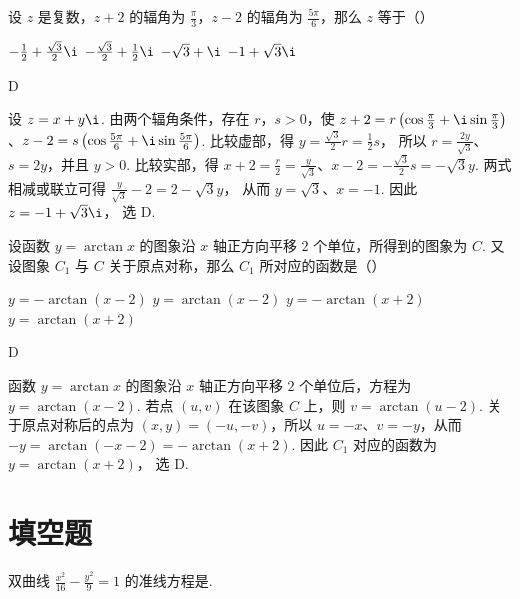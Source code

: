 \documentclass[UTF8,a4paper,oneside,11pt]{ctexbook}
\begin{document}
\begin{problem}
设 \(z\) 是复数，\(z + 2\) 的辐角为 \(\frac{\pi}{3}\)，\(z - 2\) 的辐角为 \(\frac{5\pi}{6}\)，那么 \(z\) 等于（\quad）

\choices
    {\(-\frac{1}{2}+\frac{\sqrt{3}}{2}\i\)}
    {\(-\frac{\sqrt{3}}{2}+\frac{1}{2}\i\)}
    {\(-\sqrt{3}+\i\)}
    {\(-1+\sqrt{3}\i\)}
\end{problem}

\begin{answer}
D
\end{answer}

\begin{solution}
	设 \(z=x+y\i\). 由两个辐角条件，存在 \(r\)，\(s>0\)，使
\(z+2=r\left(\cos\frac{\pi}{3}+\i\sin\frac{\pi}{3}\right)\)、\(z-2=s\left(\cos\frac{5\pi}{6}+\i\sin\frac{5\pi}{6}\right)\).
比较虚部，得
\(y=\frac{\sqrt{3}}{2}r=\frac12s\)，
所以 \(r=\frac{2y}{\sqrt{3}}\)、\(s=2y\)，并且 \(y>0\). 比较实部，得
\(x+2=\frac r2=\frac{y}{\sqrt{3}}\)、\(x-2=-\frac{\sqrt{3}}2s=-\sqrt{3}y\).
两式相减或联立可得
\(\frac{y}{\sqrt{3}}-2=2-\sqrt{3}y\)，
从而 \(y=\sqrt{3}\)、\(x=-1\). 因此 \(z=-1+\sqrt{3}\i\)，
选 D.
\end{solution}

\begin{problem}
设函数 \(y=\arctan x\) 的图象沿 \(x\) 轴正方向平移 \(2\) 个单位，所得到的图象为 \(C\). 又设图象 \(C_1\) 与 \(C\) 关于原点对称，那么 \(C_1\) 所对应的函数是（\quad）

\choices
    {\(y=-\arctan(x-2)\)}
    {\(y=\arctan(x-2)\)}
    {\(y=-\arctan(x+2)\)}
    {\(y=\arctan(x+2)\)}
\end{problem}

\begin{answer}
D
\end{answer}

\begin{solution}
函数 \(y=\arctan x\) 的图象沿 \(x\) 轴正方向平移 \(2\) 个单位后，方程为
\(y=\arctan(x-2)\).
若点 \((u,v)\) 在该图象 \(C\) 上，则 \(v=\arctan(u-2)\). 关于原点对称后的点为 \((x,y)=(-u,-v)\)，所以 \(u=-x\)、\(v=-y\)，从而
\(-y=\arctan(-x-2)=-\arctan(x+2)\).
因此 \(C_1\) 对应的函数为
\(y=\arctan(x+2)\)，
选 D.
\end{solution}

\section{填空题}

\begin{problem}
双曲线 \(\frac{x^2}{16} - \frac{y^2}{9} = 1\) 的准线方程是\fillinblank{}.
\end{problem}
\end{document}
